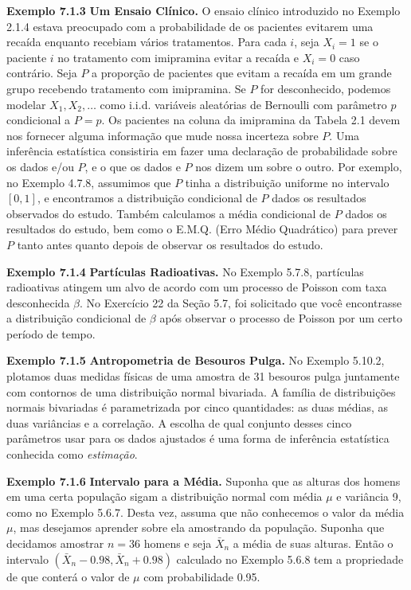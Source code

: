 \vspace{1cm}
\noindent\textbf{Exemplo 7.1.3} \quad \textbf{Um Ensaio Clínico.} O ensaio clínico introduzido no Exemplo 2.1.4 estava preocupado com a probabilidade de os pacientes evitarem uma recaída enquanto recebiam vários tratamentos. Para cada $i$, seja $X_i=1$ se o paciente $i$ no tratamento com imipramina evitar a recaída e $X_i=0$ caso contrário. Seja $P$ a proporção de pacientes que evitam a recaída em um grande grupo recebendo tratamento com imipramina. Se $P$ for desconhecido, podemos modelar $X_1, X_2, \dots$ como i.i.d. variáveis aleatórias de Bernoulli com parâmetro $p$ condicional a $P=p$. Os pacientes na coluna da imipramina da Tabela 2.1 devem nos fornecer alguma informação que mude nossa incerteza sobre $P$. Uma inferência estatística consistiria em fazer uma declaração de probabilidade sobre os dados e/ou $P$, e o que os dados e $P$ nos dizem um sobre o outro. Por exemplo, no Exemplo 4.7.8, assumimos que $P$ tinha a distribuição uniforme no intervalo $[0,1]$, e encontramos a distribuição condicional de $P$ dados os resultados observados do estudo. Também calculamos a média condicional de $P$ dados os resultados do estudo, bem como o E.M.Q. (Erro Médio Quadrático) para prever $P$ tanto antes quanto depois de observar os resultados do estudo.

\vspace{1cm}
\noindent\textbf{Exemplo 7.1.4} \quad \textbf{Partículas Radioativas.} No Exemplo 5.7.8, partículas radioativas atingem um alvo de acordo com um processo de Poisson com taxa desconhecida $\beta$. No Exercício 22 da Seção 5.7, foi solicitado que você encontrasse a distribuição condicional de $\beta$ após observar o processo de Poisson por um certo período de tempo.

\vspace{1cm}
\noindent\textbf{Exemplo 7.1.5} \quad \textbf{Antropometria de Besouros Pulga.} No Exemplo 5.10.2, plotamos duas medidas físicas de uma amostra de 31 besouros pulga juntamente com contornos de uma distribuição normal bivariada. A família de distribuições normais bivariadas é parametrizada por cinco quantidades: as duas médias, as duas variâncias e a correlação. A escolha de qual conjunto desses cinco parâmetros usar para os dados ajustados é uma forma de inferência estatística conhecida como \textit{estimação}.

\vspace{1cm}
\noindent\textbf{Exemplo 7.1.6} \quad \textbf{Intervalo para a Média.} Suponha que as alturas dos homens em uma certa população sigam a distribuição normal com média $\mu$ e variância 9, como no Exemplo 5.6.7. Desta vez, assuma que não conhecemos o valor da média $\mu$, mas desejamos aprender sobre ela amostrando da população. Suponha que decidamos amostrar $n=36$ homens e seja $\bar{X}_n$ a média de suas alturas. Então o intervalo $(\bar{X}_n - 0.98, \bar{X}_n + 0.98)$ calculado no Exemplo 5.6.8 tem a propriedade de que conterá o valor de $\mu$ com probabilidade 0.95.


